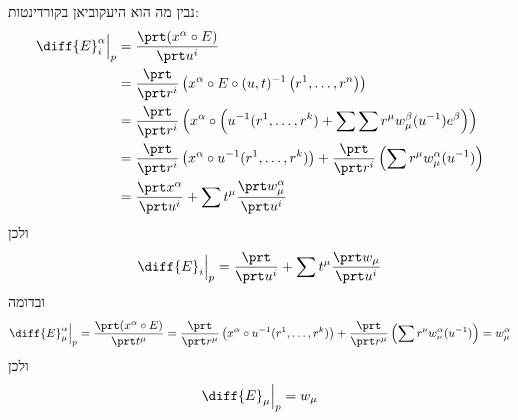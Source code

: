\documentclass{article}
\theoremstyle{definition}
\begin{document}
	נבין מה הוא היעקוביאן בקורדינטות:
	\begin{equation*}\begin{split}
		\diff{E}^\alpha_i\Big|_p
		&= \frac{\prt (x^\alpha \circ E)}{\prt u^i}
		\\&= \frac{\prt}{\prt r^i}\left (x^\alpha \circ E \circ (u,t)^{-1}\left(r^1,\dotsc,r^n\right)\right)
		\\&= \frac{\prt}{\prt r^i} \left(x^\alpha \circ \left(u^{-1}(r^1,\dotsc,r^k) + \sum\sum r^\mu w_\mu^\beta(u^{-1}) e^\beta \right)\right)
		\\&= \frac{\prt}{\prt r^i} \left(x^\alpha \circ u^{-1}(r^1,\dotsc,r^k)\right) + \frac{\prt}{\prt r^i} \left(\sum r^\mu w_\mu^\alpha(u^{-1}) \right)
		\\&= \frac{\prt x^\alpha}{\prt u^i} + \sum t^\mu \frac{\prt w_\mu^\alpha}{\prt u^i}
	\end{split}\end{equation*}
	ולכן
	\[
		\diff{E}_i\Big|_p = \frac{\prt}{\prt u^i} + \sum t^\mu \frac{\prt w_\mu}{\prt u^i}
	\]
	ובדומה
	\begin{equation*}
		\diff{E}^\alpha_\mu\Big|_p
		= \frac{\prt (x^\alpha \circ E)}{\prt t^\mu}
		= \frac{\prt}{\prt r^\mu} \left(x^\alpha \circ u^{-1}(r^1,\dotsc,r^k)\right) + \frac{\prt}{\prt r^\mu} \left(\sum r^\nu w_\nu^\alpha(u^{-1}) \right)
		= w_\mu^\alpha
	\end{equation*}
	ולכן
	\[
		\diff{E}_\mu\Big|_p = w_\mu
	\]
\end{document}

